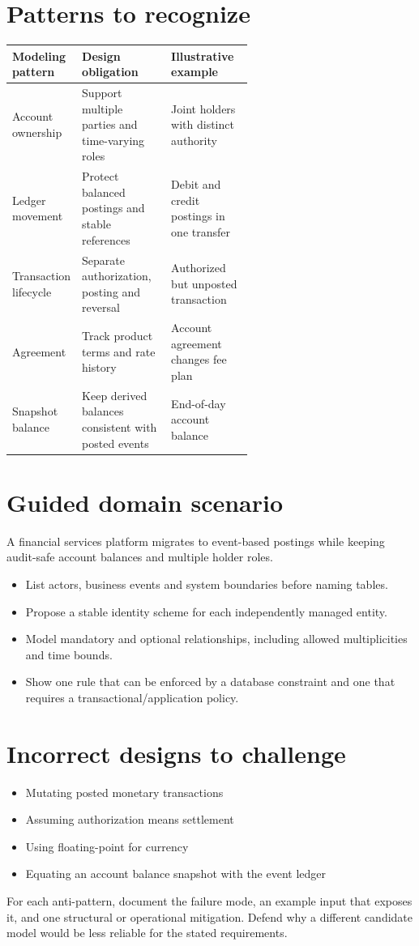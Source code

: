 \documentclass[11pt,letterpaper]{article}
\begin{document}
\section{Patterns to recognize}
\begin{tabularx}{\linewidth}{@{}>{\raggedright\arraybackslash}p{0.22\linewidth} >{\raggedright\arraybackslash}p{0.37\linewidth}>{\raggedright\arraybackslash}X@{}}
\toprule
\textbf{Modeling pattern} & \textbf{Design obligation} & \textbf{Illustrative example} \\ 
\midrule
Account ownership & Support multiple parties and time-varying roles & Joint holders with distinct authority \\ 
Ledger movement & Protect balanced postings and stable references & Debit and credit postings in one transfer \\ 
Transaction lifecycle & Separate authorization, posting and reversal & Authorized but unposted transaction \\ 
Agreement & Track product terms and rate history & Account agreement changes fee plan \\ 
Snapshot balance & Keep derived balances consistent with posted events & End-of-day account balance \\ 
\bottomrule
\end{tabularx}

\section{Guided domain scenario}
A financial services platform migrates to event-based postings while keeping audit-safe account balances and multiple holder roles.

\begin{itemize}
\item List actors, business events and system boundaries before naming tables.
\item Propose a stable identity scheme for each independently managed entity.
\item Model mandatory and optional relationships, including allowed multiplicities and time bounds.
\item Show one rule that can be enforced by a database constraint and one that requires a transactional/application policy.
\end{itemize}

\section{Incorrect designs to challenge}
\begin{itemize}
\item Mutating posted monetary transactions
\item Assuming authorization means settlement
\item Using floating-point for currency
\item Equating an account balance snapshot with the event ledger
\end{itemize}
For each anti-pattern, document the failure mode, an example input that exposes it, and one structural or operational mitigation. Defend why a different candidate model would be less reliable for the stated requirements.
\end{document}
